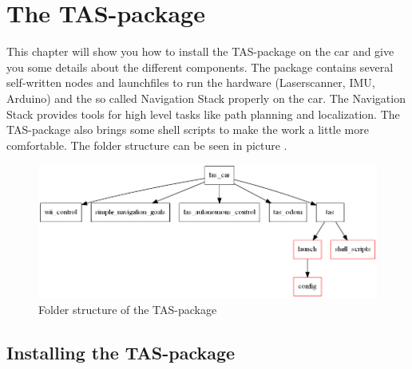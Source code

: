 \newcommand{\makro}[1]{\texttt{\textbackslash{}#1\{\}}}

\chapter{The TAS-package}
\label{sec:tas_package}

This chapter will show you how to install the TAS-package on the car and give you some details about the different components. The package contains several self-written nodes and launchfiles to run the hardware (Laserscanner, IMU, Arduino) and the so called Navigation Stack properly on the car. The Navigation Stack provides tools for high level tasks like path planning and localization. The TAS-package also brings some shell scripts to make the work a little more comfortable. The folder structure can be seen in picture .

\begin{figure}[htbp]
	\centering
		\includegraphics[width=\textwidth]{diagrams/tas_folder_struct}
	\caption{Folder structure of the TAS-package}
	\label{fig:tas_folder_struct}
\end{figure}

\newpage
\section{Installing the TAS-package}
\label{sec:tas_package_install 

As it was mentioned in the previous chapter the TAS-package can be found on GitHub. To install it open a terminal and switch to your catkin workspace directory. In this example we assume your working directory in \texttt{\textasciitilde/catkin\_ws}. To get and build the package on your car type in:

\shellcmd{cd \textasciitilde/catkin\_ws/src}\\
\shellcmd{git clone https://github.com/LSR-TAS/tas\_car}\\
\shellcmd{cd ..}\\
\shellcmd{catkin\_make}\\

If there occured no errors, the package has been built and the car is now ready to run. Before running anything you should also do the following preparations to make your work in the terminal a little more comfortable: 
\\
Open a terminal and type in:

\shellcmd{sudo gedit \textasciitilde/.bashrc}}


